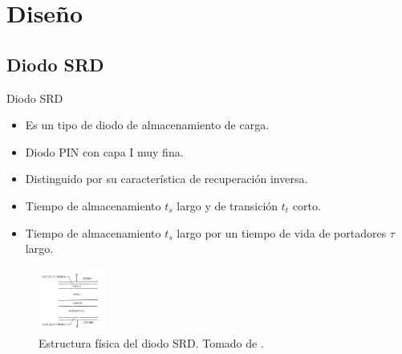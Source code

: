 \documentclass{beamer}
\begin{document}
\section{Diseño}

\subsection{Diodo SRD}

\begin{frame}{Diodo SRD}
    \begin{block}{}
        \begin{itemize}
            \item Es un tipo de diodo de almacenamiento de carga.
            \item Diodo PIN con capa I muy fina.
            \item Distinguido por su característica de recuperación inversa.
            \item Tiempo de almacenamiento $t_s$ largo y de transición $t_t$
                corto.
            \item Tiempo de almacenamiento $t_s$ largo por un tiempo de vida de
                portadores $\tau$ largo.
        \end{itemize}
    \end{block}

    \begin{figure}[t]
        \centering
        \includegraphics[width=0.2\textwidth]{images/srd_diode_structure.jpg}
        \caption{Estructura física del diodo SRD. Tomado de \cite{maas2003}.}
        \label{fig:srd_diode_structure}
    \end{figure}

\end{frame}
\end{document}
